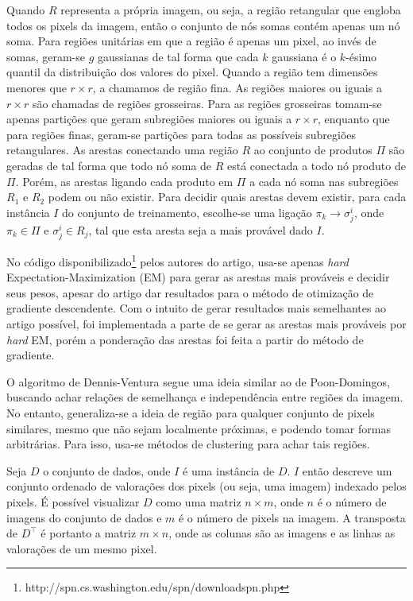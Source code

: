 \documentclass[12pt]{article}
\theoremstyle{plain}
\numberwithin{equation}{section}
\begin{document}
Quando $R$ representa a própria imagem, ou seja, a região retangular que engloba todos os pixels da
imagem, então o conjunto de nós somas contém apenas um nó soma. Para regiões unitárias em que a
região é apenas um pixel, ao invés de somas, geram-se $g$ gaussianas de tal forma que cada $k$
gaussiana é o $k$-ésimo quantil da distribuição dos valores do pixel. Quando a região tem dimensões
menores que $r\times r$, a chamamos de região fina. As regiões maiores ou iguais a $r\times
r$ são chamadas de regiões grosseiras. Para as regiões grosseiras tomam-se apenas partições que
geram subregiões maiores ou iguais a $r\times r$, enquanto que para regiões finas, geram-se
partições para todas as possíveis subregiões retangulares. As arestas conectando uma região $R$ ao
conjunto de produtos $\Pi$ são geradas de tal forma que todo nó soma de $R$ está conectada a todo
nó produto de $\Pi$. Porém, as arestas ligando cada produto em $\Pi$ a cada nó soma nas subregiões
$R_1$ e $R_2$ podem ou não existir. Para decidir quais arestas devem existir, para cada instância
$I$ do conjunto de treinamento, escolhe-se uma ligação $\pi_k\to\sigma_j^i$, onde $\pi_k\in\Pi$ e
$\sigma_j^i\in R_j$, tal que esta aresta seja a mais provável dado $I$.

No código disponibilizado\footnote{http://spn.cs.washington.edu/spn/downloadspn.php} pelos autores
do artigo, usa-se apenas \textit{hard} Expectation-Maximization (EM) para gerar as arestas mais
prováveis e decidir seus pesos, apesar do artigo dar resultados para o método de otimização de
gradiente descendente. Com o intuito de gerar resultados mais semelhantes ao artigo possível, foi
implementada a parte de se gerar as arestas mais prováveis por \textit{hard} EM, porém a ponderação
das arestas foi feita a partir do método de gradiente.

O algoritmo de Dennis-Ventura segue uma ideia similar ao de Poon-Domingos, buscando achar relações
de semelhança e independência entre regiões da imagem. No entanto, generaliza-se a ideia de região
para qualquer conjunto de pixels similares, mesmo que não sejam localmente próximas, e podendo
tomar formas arbitrárias. Para isso, usa-se métodos de clustering para achar tais regiões.

Seja $D$ o conjunto de dados, onde $I$ é uma instância de $D$. $I$ então descreve um conjunto
ordenado de valorações dos pixels (ou seja, uma imagem) indexado pelos pixels. É possível
visualizar $D$ como uma matriz $n\times m$, onde $n$ é o número de imagens do conjunto de dados e
$m$ é o número de pixels na imagem. A transposta de $D^\intercal$ é portanto a matriz $m\times n$,
onde as colunas são as imagens e as linhas as valorações de um mesmo pixel.
\end{document}
